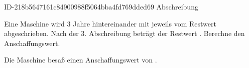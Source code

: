 \begin{exercise}
      {ID-218b5647161c84900988f5064bba4fd769dded69}
      {Abschreibung}
  \ifproblem\problem\par
    Eine Maschine wird 3 Jahre hintereinander mit jeweils
     vom Restwert abgeschrieben. Nach der 3.
    Abschreibung beträgt der Restwert . Berechne den
    Anschaffungswert.
  \fi
  \ifoutcome\outcome\par
    Die Maschine besaß einen Anschaffungswert von .
  \fi
\end{exercise}
